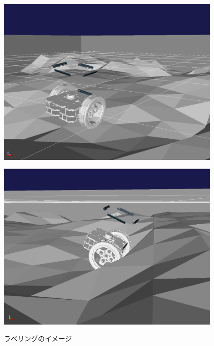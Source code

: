 \documentclass[uplatex,twocolumn, dvipdfmx]{jsarticle}  %
\begin{document}
\begin{figure}[t]
  \centering
  \begin{minipage}[b]{0.47\linewidth}
    \centering
    \includegraphics[keepaspectratio, scale=0.1]{images/safe.png}
    \label{fig:safe}
  \end{minipage}
  \begin{minipage}[b]{0.47\linewidth}
    \centering
    \includegraphics[keepaspectratio, scale=0.096]{images/stack.png}
    \label{fig:stack}
  \end{minipage}
  \caption{ラベリングのイメージ}\label{fig:labeling}
\end{figure}
\end{document}
